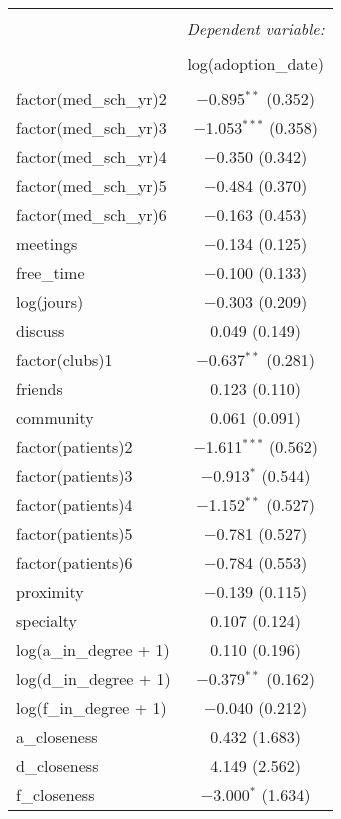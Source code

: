 \documentclass[11pt]{article}
\begin{document}
\begin{table}[!htbp] \centering 
  \caption{} 
  \label{} 
\begin{tabular}{@{\extracolsep{5pt}}lc} 
\\[-1.8ex]\hline 
\hline \\[-1.8ex] 
 & \multicolumn{1}{c}{\textit{Dependent variable:}} \\ 
\cline{2-2} 
\\[-1.8ex] & log(adoption\_date) \\ 
\hline \\[-1.8ex] 
 factor(med\_sch\_yr)2 & $-$0.895$^{**}$ (0.352) \\ 
  factor(med\_sch\_yr)3 & $-$1.053$^{***}$ (0.358) \\ 
  factor(med\_sch\_yr)4 & $-$0.350 (0.342) \\ 
  factor(med\_sch\_yr)5 & $-$0.484 (0.370) \\ 
  factor(med\_sch\_yr)6 & $-$0.163 (0.453) \\ 
  meetings & $-$0.134 (0.125) \\ 
  free\_time & $-$0.100 (0.133) \\ 
  log(jours) & $-$0.303 (0.209) \\ 
  discuss & 0.049 (0.149) \\ 
  factor(clubs)1 & $-$0.637$^{**}$ (0.281) \\ 
  friends & 0.123 (0.110) \\ 
  community & 0.061 (0.091) \\ 
  factor(patients)2 & $-$1.611$^{***}$ (0.562) \\ 
  factor(patients)3 & $-$0.913$^{*}$ (0.544) \\ 
  factor(patients)4 & $-$1.152$^{**}$ (0.527) \\ 
  factor(patients)5 & $-$0.781 (0.527) \\ 
  factor(patients)6 & $-$0.784 (0.553) \\ 
  proximity & $-$0.139 (0.115) \\ 
  specialty & 0.107 (0.124) \\ 
  log(a\_in\_degree + 1) & 0.110 (0.196) \\ 
  log(d\_in\_degree + 1) & $-$0.379$^{**}$ (0.162) \\ 
  log(f\_in\_degree + 1) & $-$0.040 (0.212) \\ 
  a\_closeness & 0.432 (1.683) \\ 
  d\_closeness & 4.149 (2.562) \\ 
  f\_closeness & $-$3.000$^{*}$ (1.634) \\ 

\end{tabular}
\end{table}
\end{document}

